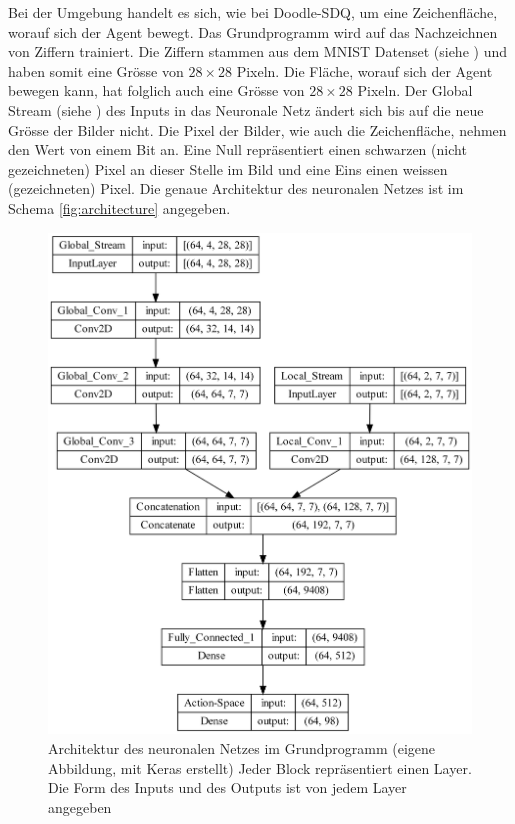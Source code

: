 Bei der Umgebung handelt es sich, wie bei Doodle-SDQ, um eine Zeichenfläche,
worauf sich der Agent bewegt. Das Grundprogramm wird auf das
Nachzeichnen von Ziffern trainiert. Die Ziffern stammen aus dem MNIST Datenset
(siehe ) und haben somit eine Grösse von $28\times28$
Pixeln. Die Fläche, worauf sich der Agent bewegen   
kann, hat folglich auch eine Grösse von $28\times28$ Pixeln. Der Global Stream
(siehe ) des Inputs in das Neuronale Netz ändert sich
bis auf die neue Grösse der Bilder nicht. Die Pixel der Bilder, wie auch die
Zeichenfläche, nehmen den Wert von einem Bit an. Eine Null repräsentiert einen
schwarzen (nicht gezeichneten) Pixel an dieser Stelle im Bild und eine Eins
einen weissen (gezeichneten) Pixel. Die genaue Architektur des neuronalen Netzes
ist im Schema \autoref{fig:architecture} angegeben.

\begin{figure}[!ht]
  \centering
  \includegraphics[width=\textwidth-2cm]{images/methode/architecture.png}
  \caption{Architektur des neuronalen Netzes im Grundprogramm (eigene Abbildung, mit Keras erstellt) Jeder Block repräsentiert einen Layer. Die Form des Inputs und des Outputs ist von jedem Layer angegeben}
  \label{fig:architecture}
\end{figure}

